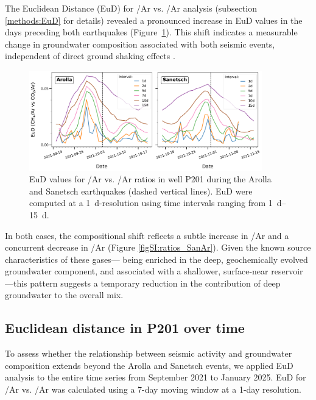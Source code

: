 The Euclidean Distance (EuD) for /Ar vs. /Ar analysis (subsection \ref{methods:EuD} for details) revealed a pronounced increase in EuD values in the days preceding both earthquakes (Figure~\ref{fig:EuD_SanAr}).
This shift indicates a measurable change in groundwater composition associated with both seismic events, independent of direct ground shaking effects \citep{giroud2023new}.

\begin{figure}[H]
    \centering
    \includegraphics[width=0.9\textwidth]{chapters/04_chap3/figures/article_EuD_SanAr.pdf}
    \caption{EuD values for /Ar vs. /Ar ratios in well P201 during the Arolla and Sanetsch earthquakes (dashed vertical lines).
    EuD were computed at a \SI{1}{\day}-resolution using time intervals ranging from \SIrange{1}{15}{\day}.
    }
    \label{fig:EuD_SanAr}
\end{figure}

In both cases, the compositional shift reflects a subtle increase in /Ar and a concurrent decrease in /Ar (Figure \ref{figSI:ratios_SanAr}).
Given the known source characteristics of these gases--- being enriched in the deep, geochemically evolved groundwater component, and  associated with a shallower, surface-near reservoir \citep{giroud2025microbio}---this pattern suggests a temporary reduction in the contribution of deep groundwater to the overall mix.

\subsection{Euclidean distance in P201 over time}
To assess whether the relationship between seismic activity and groundwater composition extends beyond the Arolla and Sanetsch events, we applied EuD analysis to the entire time series from September 2021 to January 2025.
EuD for /Ar vs. /Ar was calculated using a 7-day moving window at a 1-day resolution.

